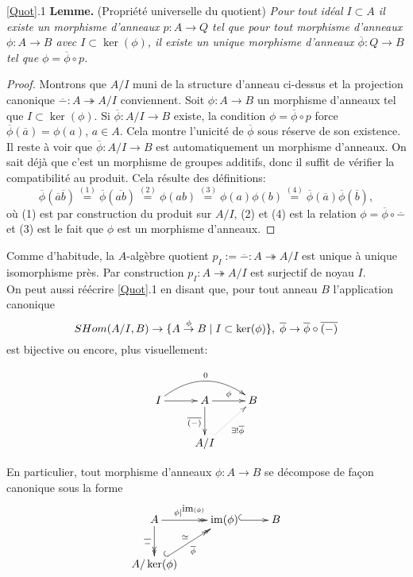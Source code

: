 \documentclass[a4paper, oneside, 12pt]{book}
\theoremstyle{theoremeStyle} %
\theoremstyle{definition} %
\DeclareMathOperator{\SHom}{Hom}
\DeclareMathOperator{\im}{im}
\begin{document}
 \ref{Quot}.1 \textbf{Lemme.} (Propriété universelle du quotient) \textit{Pour tout idéal $I\subset A$ il existe un morphisme d'anneaux $p:A\rightarrow Q$ tel  que pour tout  morphisme d'anneaux $\phi:A\rightarrow B$ avec $I\subset \ker(\phi)$, il  existe un unique morphisme d'anneaux $\overline{\phi}:Q\rightarrow B$ tel que $\phi=  \overline{\phi}\circ p$.}

 \begin{proof} Montrons que  $A/I$ muni de la structure d'anneau ci-dessus et la projection canonique $\overline{-}:A\twoheadrightarrow A/I$ conviennent. Soit $\phi:A\rightarrow B$  un morphisme d'anneaux tel que $I\subset \ker(\phi)$. Si
 $\overline{\phi}:A/I\rightarrow B$ existe, la condition $\phi=  \overline{\phi}\circ p$ force $\overline{\phi}(\overline{a})=\phi(a)$, $a\in A$. Cela montre l'unicité de $\overline{\phi}$ sous réserve de son existence.   Il reste à voir que  $\overline{\phi}:A/I\rightarrow B$ est automatiquement un morphisme d'anneaux. On sait déjà que c'est un morphisme de groupes additifs, donc il suffit de vérifier la compatibilité au produit. Cela résulte des définitions: $$\overline{\phi}(\overline{a}\overline{b})\stackrel{(1)}{=}\overline{\phi}(\overline{a b})\stackrel{(2)}{=} \phi(ab)\stackrel{(3)}{=} \phi(a)\phi(b)\stackrel{(4)}{=}\overline{\phi}(\overline{a})\overline{\phi}(\overline{b}),$$
 où (1) est par construction du produit sur $A/I$, (2) et (4) est la relation  $\phi=  \overline{\phi}\circ \overline{-}$ et (3) est le fait que $\phi$ est un morphisme d'anneaux. \end{proof}

  Comme d'habitude, la $A$-algèbre quotient   $p_I:=\overline{-}:A\twoheadrightarrow A/I$ est unique à unique isomorphisme près.  Par construction $p_I: A\twoheadrightarrow A/I$ est surjectif de noyau $I$. \\

   On peut aussi réécrire \ref{Quot}.1 en disant que, pour tout anneau $B$ l'application  canonique
$$\\SHom(A/I,B)\rightarrow \lbrace A\stackrel{\phi}{\rightarrow}B\; |\; I\subset \ker(\phi)  \rbrace,\;\overline{\phi}\rightarrow \overline{\phi}\circ\overline{(-)}  $$
est bijective  ou encore, plus visuellement:

$$\xymatrix{I\ar[r]\ar@/^1.5pc/[rr]^{0}&A\ar[r]^{\phi}\ar[d]_{\overline{(-)}}&B\\
&A/I\ar@{.>}[ur]_{\exists ! \overline{\phi}}&}$$

   En particulier, tout  morphisme d'anneaux $\phi:A\rightarrow B$ se décompose de façon canonique sous la forme
  $$\xymatrix{A\ar@{->>}[r]^{\phi|^{\hbox{\rm \small im}(\phi)}}\ar@{->>}[d]_{\overline{-}}&\im(\phi)\ar@{^{(}->}[r]&B\\
  A/\ker(\phi)\ar@{^{(}->>}[ur]^\simeq_{\overline{\phi}}&&}$$
\end{document}
